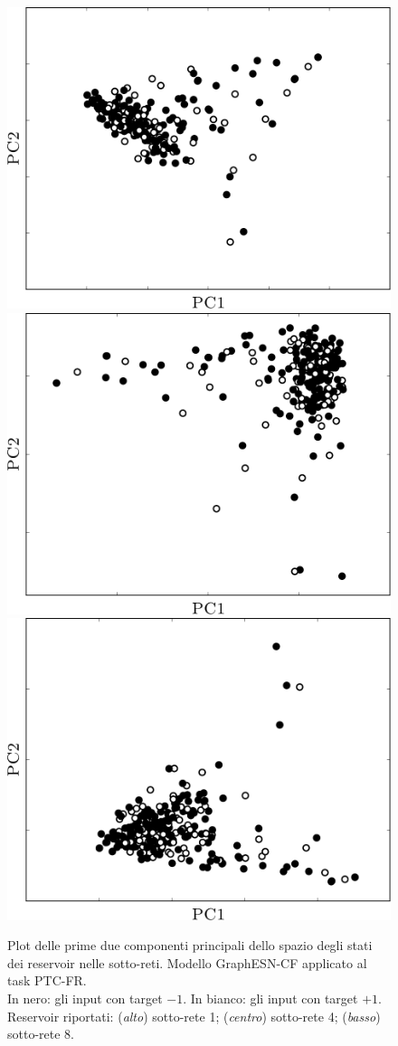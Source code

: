%
\begin{figure}[p]
\centering
\includegraphics[width=0.5\columnwidth]{img/pca/pca-ptc-nofof1}\\
\vspace*{0.8cm}
\includegraphics[width=0.5\columnwidth]{img/pca/pca-ptc-nofof2}\\
\vspace*{0.8cm}
\includegraphics[width=0.5\columnwidth]{img/pca/pca-ptc-nofof3}\\
\medskip
\caption[PCA dei reservoir. GraphESN-CF su PTC-FR.]{Plot delle prime due componenti principali dello spazio degli stati dei reservoir nelle sotto-reti. Modello GraphESN-CF applicato al task PTC-FR.\\ 
In nero: gli input con target $-1$. In bianco: gli input con target $+1$.\\
Reservoir riportati: (\emph{alto}) sotto-rete 1; (\emph{centro}) sotto-rete 4; (\emph{basso}) sotto-rete 8.}
\label{fig:esperimenti:pca-ptc-nofof}
\end{figure}
